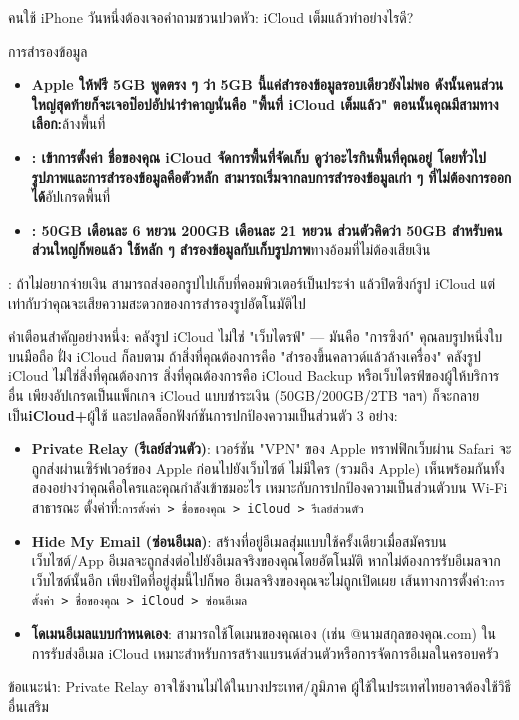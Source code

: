 
คนใช้ iPhone วันหนึ่งต้องเจอคำถามชวนปวดหัว: iCloud เต็มแล้วทำอย่างไรดี?

การสำรองข้อมูล

\begin{itemize}
  \item \textbf{Apple ให้ฟรี 5GB พูดตรง ๆ ว่า 5GB นี้แค่สำรองข้อมูลรอบเดียวยังไม่พอ ดังนั้นคนส่วนใหญ่สุดท้ายก็จะเจอป๊อปอัปน่ารำคาญนั่นคือ "พื้นที่ iCloud เต็มแล้ว" ตอนนั้นคุณมีสามทางเลือก:}ล้างพื้นที่
  \item \textbf{: เข้าการตั้งค่า ชื่อของคุณ iCloud จัดการพื้นที่จัดเก็บ ดูว่าอะไรกินพื้นที่คุณอยู่ โดยทั่วไปรูปภาพและการสำรองข้อมูลคือตัวหลัก สามารถเริ่มจากลบการสำรองข้อมูลเก่า ๆ ที่ไม่ต้องการออกได้}อัปเกรดพื้นที่
  \item \textbf{: 50GB เดือนละ 6 หยวน 200GB เดือนละ 21 หยวน ส่วนตัวคิดว่า 50GB สำหรับคนส่วนใหญ่ก็พอแล้ว ใช้หลัก ๆ สำรองข้อมูลกับเก็บรูปภาพ}ทางอ้อมที่ไม่ต้องเสียเงิน
\end{itemize}

: ถ้าไม่อยากจ่ายเงิน สามารถส่งออกรูปไปเก็บที่คอมพิวเตอร์เป็นประจำ แล้วปิดซิงก์รูป iCloud แต่เท่ากับว่าคุณจะเสียความสะดวกของการสำรองรูปอัตโนมัติไป

\begin{tcbinfo}{คำเตือนสำคัญอย่างหนึ่ง: คลังรูป iCloud ไม่ใช่ "เว็บไดรฟ์" — มันคือ "การซิงก์" คุณลบรูปหนึ่งใบบนมือถือ ฝั่ง iCloud ก็ลบตาม ถ้าสิ่งที่คุณต้องการคือ "สำรองขึ้นคลาวด์แล้วล้างเครื่อง" คลังรูป iCloud ไม่ใช่สิ่งที่คุณต้องการ สิ่งที่คุณต้องการคือ iCloud Backup หรือเว็บไดรฟ์ของผู้ให้บริการอื่น}
เพียงอัปเกรดเป็นแพ็กเกจ iCloud แบบชำระเงิน (50GB/200GB/2TB ฯลฯ) ก็จะกลายเป็น\textbf{iCloud+}ผู้ใช้ และปลดล็อกฟังก์ชันการปกป้องความเป็นส่วนตัว 3 อย่าง:

\begin{itemize}
  \item \textbf{Private Relay (รีเลย์ส่วนตัว)}: เวอร์ชัน "VPN" ของ Apple ทราฟฟิกเว็บผ่าน Safari จะถูกส่งผ่านเซิร์ฟเวอร์ของ Apple ก่อนไปยังเว็บไซต์ ไม่มีใคร (รวมถึง Apple) เห็นพร้อมกันทั้งสองอย่างว่าคุณคือใครและคุณกำลังเข้าชมอะไร เหมาะกับการปกป้องความเป็นส่วนตัวบน Wi-Fi สาธารณะ ตั้งค่าที่:\texttt{การตั้งค่า > ชื่อของคุณ > iCloud > รีเลย์ส่วนตัว}
  \item \textbf{Hide My Email (ซ่อนอีเมล)}: สร้างที่อยู่อีเมลสุ่มแบบใช้ครั้งเดียวเมื่อสมัครบนเว็บไซต์/App อีเมลจะถูกส่งต่อไปยังอีเมลจริงของคุณโดยอัตโนมัติ หากไม่ต้องการรับอีเมลจากเว็บไซต์นั้นอีก เพียงปิดที่อยู่สุ่มนี้ไปก็พอ อีเมลจริงของคุณจะไม่ถูกเปิดเผย เส้นทางการตั้งค่า:\texttt{การตั้งค่า > ชื่อของคุณ > iCloud > ซ่อนอีเมล}
  \item \textbf{โดเมนอีเมลแบบกำหนดเอง}: สามารถใช้โดเมนของคุณเอง (เช่น @นามสกุลของคุณ.com) ในการรับส่งอีเมล iCloud เหมาะสำหรับการสร้างแบรนด์ส่วนตัวหรือการจัดการอีเมลในครอบครัว
\end{itemize}

ข้อแนะนำ: Private Relay อาจใช้งานไม่ได้ในบางประเทศ/ภูมิภาค ผู้ใช้ในประเทศไทยอาจต้องใช้วิธีอื่นเสริม

\end{tcbinfo}

